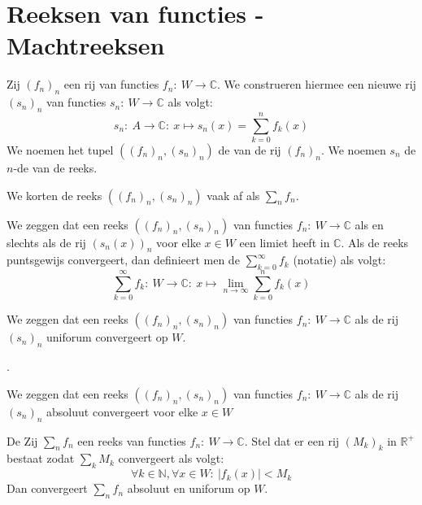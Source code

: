 \documentclass[main.tex]{subfiles}
\begin{document}
\section{Reeksen van functies - Machtreeksen}
\label{sec:reeksen-van-functies}

\begin{de}
  Zij $(f_{n})_{n}$ een rij van functies $f_{n}:\ W  \rightarrow \mathbb{C}$.
  We construeren hiermee een nieuwe rij $(s_{n})_{n}$ van functies $s_{n}:\ W \rightarrow \mathbb{C}$ als volgt:
  \[ s_{n}:\ A \rightarrow \mathbb{C}:\ x \mapsto s_{n}(x) = \sum_{k=0}^{n}f_{k}(x) \]
  We noemen het tupel $((f_{n})_{n},(s_{n})_{n})$ de  van de rij $(f_{n})_{n}$.
  We noemen $s_{n}$ de $n$-de  van de reeks.
\end{de}

\begin{de}
  We korten de reeks $((f_{n})_{n},(s_{n})_{n})$ vaak af als $\sum_{n}f_{n}$.
\end{de}

\begin{de}
  We zeggen dat een reeks $((f_{n})_{n},(s_{n})_{n})$ van functies $f_{n}:\ W \rightarrow \mathbb{C}$  als en slechts als de rij $(s_{n}(x))_{n}$ voor elke $x\in W$ een limiet heeft in $\mathbb{C}$.
  Als de reeks puntsgewijs convergeert, dan definieert men de  $\sum_{k=0}^{\infty}f_{k}$ (notatie) als volgt:
  \[ \sum_{k=0}^{\infty}f_{k}:\ W \rightarrow \mathbb{C}:\ x \mapsto \lim_{n \rightarrow \infty}\sum_{k=0}^{n}f_{k}(x) \]
\end{de}

\begin{de}
  We zeggen dat een reeks $((f_{n})_{n},(s_{n})_{n})$ van functies $f_{n}:\ W \rightarrow \mathbb{C}$  als de rij $(s_{n})_{n}$ uniforum convergeert op $W$.
\end{de}

.

\begin{de}
  We zeggen dat een reeks $((f_{n})_{n},(s_{n})_{n})$ van functies $f_{n}:\ W \rightarrow \mathbb{C}$  als de rij $(s_{n})_{n}$ absoluut convergeert voor elke $x \in W$
\end{de}

\begin{bst}
  De 
  Zij $\sum_{n}f_{n}$ een reeks van functies $f_{n}:\ W \rightarrow \mathbb{C}$.
  Stel dat er een rij $(M_{k})_{k}$ in $\mathbb{R}^{+}$ bestaat zodat $\sum_{k}M_{k}$ convergeert als volgt:
  \[ \forall k\in \mathbb{N}, \forall x \in W:\ |f_{k}(x)| < M_{k} \]
  Dan convergeert $\sum_{n}f_{n}$ absoluut en uniforum op $W$.
\end{bst}
\end{document}
